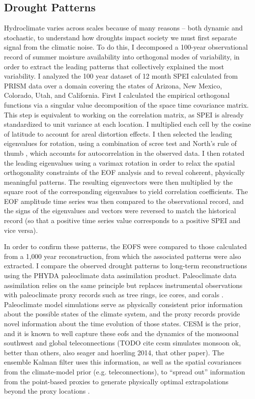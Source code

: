 \documentclass[10pt]{iopart}
\begin{document}
\subsection*{Drought Patterns}
Hydroclimate varies across scales because of many reasons -- both dynamic and stochastic, to understand how droughts impact society we must first separate signal from the climatic noise. To do this, I decomposed a 100-year observational record of summer moisture availability into orthogonal modes of variability, in order to extract the leading patterns that collectively explained the most variability. I analyzed the 100 year dataset of 12 month SPEI calculated from PRISM data over a domain covering the states of Arizona, New Mexico, Colorado, Utah, and California. First I calculated the empirical orthogonal functions via a singular value decomposition of the space time covariance matrix. This step is equivalent to working on the correlation matrix, as SPEI is already standardized to unit variance at each location. I multiplied each cell by the cosine of latitude to account for areal distortion effects. I then selected the leading eigenvalues for rotation, using a combination of scree test and North's rule of thumb \parencite{North1982}, which accounts for autocorrelation in the observed data. I then rotated the leading eigenvalues using a varimax rotation in order to relax the spatial orthogonality constraints of the EOF analysis and to reveal coherent, physically meaningful patterns. The resulting eigenvectors were then multiplied by the square root of the corresponding eigenvalues to yield correlation coefficients. The EOF amplitude time series was then compared to the observational record, and the signs of the eigenvalues and vectors were reversed to match the historical record (so that a positive time series value corresponds to a positive SPEI and vice versa).

In order to confirm these patterns, the EOFS were compared to those calculated from a 1,000 year reconstruction, from which the associated patterns were also extracted. I compare the observed drought patterns to long-term reconstructions using the PHYDA paleoclimate data assimilation product. Paleoclimate data assimilation relies on the same principle but replaces instrumental observations with paleoclimate proxy records such as tree rings, ice cores, and corals \parencite{Hakim2016TheResults}. Paleoclimate model simulations serve as physically consistent prior information about the possible states of the climate system, and the proxy records provide novel information about the time evolution of those states. CESM is the prior, and it is known to well capture these eofs and the dynamics of the monsoonal southwest and global teleconnections (TODO cite ccsm simulates monsoon ok, better than others, also seager and hoerling 2014, that other paper). The ensemble Kalman filter uses this information, as well as the spatial covariances from the climate-model prior (e.g. teleconnections), to ``spread out'' information from the point-based proxies to generate physically optimal extrapolations beyond the proxy locations \parencite{Acevedo2015TowardsTechniques,Hakim2016TheResults}.
\end{document}
